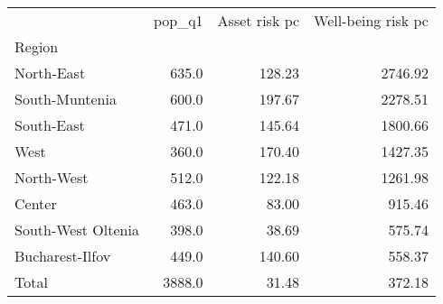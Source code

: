 \begin{tabular}{lrrr}
\toprule
{} &  pop\_q1 &  Asset risk pc &  Well-being risk pc \\
Region             &         &                &                     \\
\midrule
North-East         &   635.0 &         128.23 &             2746.92 \\
South-Muntenia     &   600.0 &         197.67 &             2278.51 \\
South-East         &   471.0 &         145.64 &             1800.66 \\
West               &   360.0 &         170.40 &             1427.35 \\
North-West         &   512.0 &         122.18 &             1261.98 \\
Center             &   463.0 &          83.00 &              915.46 \\
South-West Oltenia &   398.0 &          38.69 &              575.74 \\
Bucharest-Ilfov    &   449.0 &         140.60 &              558.37 \\
Total              &  3888.0 &          31.48 &              372.18 \\
\bottomrule
\end{tabular}
